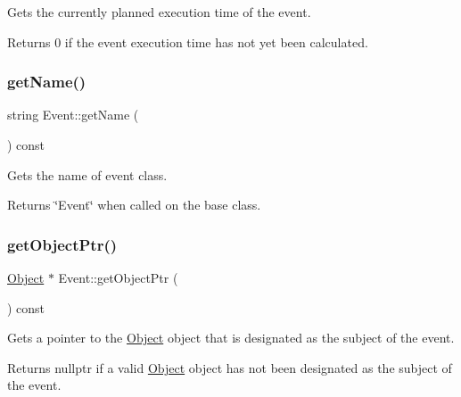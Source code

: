 Gets the currently planned execution time of the event. 

\begin{DoxyReturn}{Returns}
0 if the event execution time has not yet been calculated. 
\end{DoxyReturn}
\mbox{\label{class_event_a8c38a406d844d05eac1ef007bad2487f}} 
\subsubsection{\texorpdfstring{get\+Name()}{getName()}}
{\footnotesize\ttfamily string Event\+::get\+Name (\begin{DoxyParamCaption}{ }\end{DoxyParamCaption}) const\hspace{0.3cm}{\ttfamily [virtual]}}



Gets the name of event class. 

\begin{DoxyReturn}{Returns}
\char`\"{}\+Event\char`\"{} when called on the base class. 
\end{DoxyReturn}
\mbox{\label{class_event_a5317d42bb07d0e75bec0c13bd9bf6de8}} 
\subsubsection{\texorpdfstring{get\+Object\+Ptr()}{getObjectPtr()}}
{\footnotesize\ttfamily \hyperlink{class_object}{Object} $\ast$ Event\+::get\+Object\+Ptr (\begin{DoxyParamCaption}{ }\end{DoxyParamCaption}) const}



Gets a pointer to the \hyperlink{class_object}{Object} object that is designated as the subject of the event. 

\begin{DoxyReturn}{Returns}
nullptr if a valid \hyperlink{class_object}{Object} object has not been designated as the subject of the event. 
\end{DoxyReturn}
\mbox{\label{class_event_ab86f724c3c894faa1d6ccca78c357d24}} 
